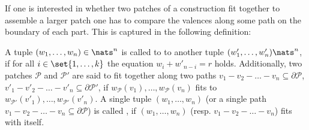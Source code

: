 If one is interested in whether two patches of a construction fit together to assemble a larger patch one has to compare the valences along some path on the boundary of each part. This is captured in the following definition:
\begin{definition}
  A tuple $(w_1, \dots, w_n) \in \nats^n$ is called to  to another tuple $(w'_1, \dots, w'_n) \nats^n$, if for all $i \in \set{1, \dots, k}$ the equation $w_i + w'_{n-i} = r$ holds. Additionally, two patches $\mathcal{P}$ and $\mathcal{P}'$ are said to fit together along two paths $v_1 - v_2 - \dots - v_n \subseteq \partial\mathcal{P}$, $v'_1 - v'_2 - \dots - v'_n \subseteq \partial\mathcal{P'}$, if $w_{\mathcal{P}}(v_1), \dots, w_{\mathcal{P}}(v_n)$ fits to $w_{\mathcal{P'}}(v'_1), \dots, w_{\mathcal{P'}}(v'_n)$. A single tuple $(w_1, \dots, w_n)$ (or a single path $v_1 - v_2 - \dots - v_n \subseteq \partial\mathcal{P}$) is called , if $(w_1, \dots, w_n)$ (resp. $v_1 - v_2 - \dots - v_n$) fits with itself.
\end{definition}

